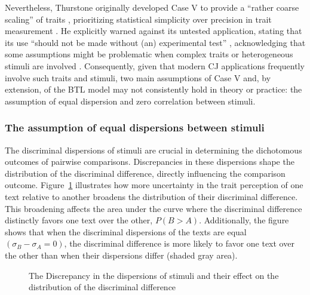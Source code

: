 \documentclass[
  authoryear,
  preprint,
  1p]{elsarticle}
\begin{document}
Nevertheless, Thurstone originally developed Case V to provide a
``rather coarse scaling'' of traits \citep[pp.~269]{Thurstone_1927b},
prioritizing statistical simplicity over precision in trait measurement
\citep[pp.~677]{Kelly_et_al_2022}. He explicitly warned against its
untested application, stating that its use ``should not be made without
(an) experimental test'' \citep[pp.~270]{Thurstone_1927b}, acknowledging
that some assumptions might be problematic when complex traits or
heterogeneous stimuli are involved \citep[pp.~376]{Thurstone_1927a}.
Consequently, given that modern CJ applications frequently involve such
traits and stimuli, two main assumptions of Case V and, by extension, of
the BTL model may not consistently hold in theory or practice: the
assumption of equal dispersion and zero correlation between stimuli.

\subsubsection{The assumption of equal dispersions between
stimuli}\label{sec-theory-issue1a}

The discriminal dispersions of stimuli are crucial in determining the
dichotomous outcomes of pairwise comparisons. Discrepancies in these
dispersions shape the distribution of the discriminal difference,
directly influencing the comparison outcome. Figure~\ref{fig-dispersion}
illustrates how more uncertainty in the trait perception of one text
relative to another broadens the distribution of their discriminal
difference. This broadening affects the area under the curve where the
discriminal difference distinctly favors one text over the other,
\(P(B > A)\). Additionally, the figure shows that when the discriminal
dispersions of the texts are equal \((\sigma_{B}-\sigma_{A}=0)\), the
discriminal difference is more likely to favor one text over the other
than when their dispersions differ (shaded gray area).

\begin{figure}


\caption{\label{fig-dispersion}The Discrepancy in the dispersions of
stimuli and their effect on the distribution of the discriminal
difference}

\end{figure}%
\end{document}

